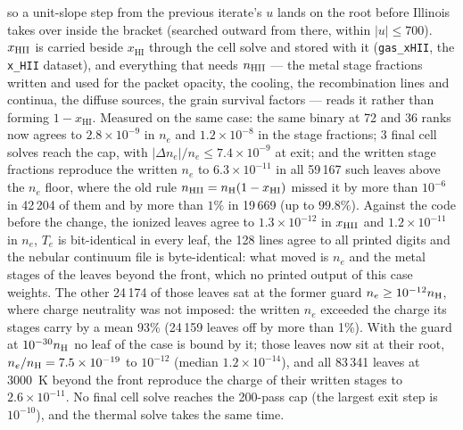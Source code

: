 \documentclass[english,a4paper]{my_memo}
\newcommand{\code}[1]{\texttt{#1}}
\newcommand{\xHI}{x_{\mathrm{HI}}}
\begin{document}
so a unit-slope step from the previous iterate's $u$ lands on the root
before Illinois takes over inside the bracket (searched outward from there,
within $|u| \le 700$).  $x_{\rm HII}$ is carried beside $\xHI$ through the
cell solve and stored with it (\code{gas\_xHII}, the \code{x\_HII}
dataset), and everything that needs $n_{\rm HII}$ --- the metal stage
fractions written and used for the packet opacity, the cooling, the
recombination lines and continua, the diffuse sources, the grain survival
factors --- reads it rather than forming $1-\xHI$.  Measured on the same
case: the same binary at 72 and 36 ranks now agrees to $2.8\times10^{-9}$
in $n_e$ and $1.2\times10^{-8}$ in the stage fractions; 3 final cell solves
reach the cap, with $|\Delta n_e|/n_e \le 7.4\times10^{-9}$ at exit; and
the written stage fractions reproduce the written $n_e$ to
$6.3\times10^{-11}$ in all 59\,167 such leaves above the $n_e$ floor,
where the old rule $n_{\rm HII} = n_{\rm H}(1-\xHI)$ missed it by more than
$10^{-6}$ in 42\,204 of them and by more than $1\%$ in 19\,669 (up to
$99.8\%$).  Against the code before the change, the ionized leaves agree to
$1.3\times10^{-12}$ in $x_{\rm HII}$ and $1.2\times10^{-11}$ in $n_e$,
$T_e$ is bit-identical in every leaf, the 128 lines agree to all printed
digits and the nebular continuum file is byte-identical: what moved is
$n_e$ and the metal stages of the leaves beyond the front, which no printed
output of this case weights.  The other 24\,174 of those leaves sat at
the former guard $n_e \geq 10^{-12}n_{\rm H}$, where charge neutrality was
not imposed: the written $n_e$ exceeded the charge its stages carry by a
mean 93\% (24\,159 leaves off by more than 1\%).  With the guard at
$10^{-30}n_{\rm H}$ no leaf of the case is bound by it; those leaves now
sit at their root, $n_e/n_{\rm H} = 7.5\times10^{-19}$ to $10^{-12}$
(median $1.2\times10^{-14}$), and all 83\,341 leaves at 3000~K beyond the
front reproduce the charge of their written stages to $2.6\times10^{-11}$.
No final cell solve reaches the 200-pass cap (the largest exit step is
$10^{-10}$), and the thermal solve takes the same time.
\end{document}
